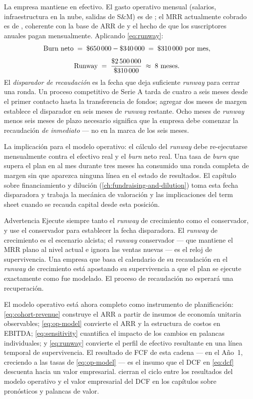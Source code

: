 \begin{example}
La empresa mantiene  en efectivo. El gasto operativo mensual (salarios,
infraestructura en la nube, salidas de S\&M) es de ; el MRR actualmente cobrado
es de , coherente con la base de ARR de  y el hecho de que los
suscriptores anuales pagan mensualmente. Aplicando \cref{eq:runway}:
\[
  \text{Burn neto}
  \;=\; \$\num{650000} - \$\num{340000}
  \;=\; \$\num{310000}\text{ por mes},
\]
\[
  \text{Runway}
  \;=\; \frac{\$\num{2500000}}{\$\num{310000}}
  \;\approx\; \text{8 meses}.
\]
El \emph{disparador de recaudación} es la fecha que deja suficiente \emph{runway} para cerrar
una ronda. Un proceso competitivo de Serie A tarda de cuatro a seis meses desde el primer
contacto hasta la transferencia de fondos; agregar dos meses de margen establece el disparador
en seis meses de \emph{runway} restante. Ocho meses de \emph{runway} menos seis meses de plazo
necesario significa que la empresa debe comenzar la recaudación \emph{de inmediato} --- no en
la marca de los seis meses.

La implicación para el modelo operativo: el cálculo del \emph{runway} debe re-ejecutarse
mensualmente contra el efectivo real y el \emph{burn} neto real. Una tasa de \emph{burn} que
supera el plan en  al mes durante tres meses ha consumido una ronda completa de
margen sin que aparezca ninguna línea en el estado de resultados. El capítulo sobre
financiamiento y dilución (\cref{ch:fundraising-and-dilution}) toma esta fecha disparadora y
trabaja la mecánica de valoración y las implicaciones del term sheet cuando se recauda capital
desde esta posición.
\end{example}

\begin{admonition}{Advertencia}
Ejecute siempre tanto el \emph{runway} de crecimiento como el conservador, y use el conservador
para establecer la fecha disparadora. El \emph{runway} de crecimiento es el escenario alcista;
el \emph{runway} conservador --- que mantiene el MRR plano al nivel actual e ignora las ventas
nuevas --- es el reloj de supervivencia. Una empresa que basa el calendario de su recaudación
en el \emph{runway} de crecimiento está apostando su supervivencia a que el plan se ejecute
exactamente como fue modelado. El proceso de recaudación no esperará una recuperación.
\end{admonition}

El modelo operativo está ahora completo como instrumento de planificación: \cref{eq:cohort-revenue}
construye el ARR a partir de insumos de economía unitaria observables; \cref{eq:op-model}
convierte el ARR y la estructura de costos en EBITDA; \cref{eq:sensitivity} cuantifica el
impacto de los cambios en palancas individuales; y \cref{eq:runway} convierte el perfil de
efectivo resultante en una línea temporal de supervivencia. El resultado de FCF de esta cadena
---  en el Año~1, creciendo a las tasas de \cref{eq:op-model} --- es el insumo
que el DCF en \cref{eq:dcf} descuenta hacia un valor empresarial.
\textcite{koller2025valuation} cierran el ciclo entre los resultados del modelo operativo y el
valor empresarial del DCF en los capítulos sobre pronósticos y palancas de valor.
